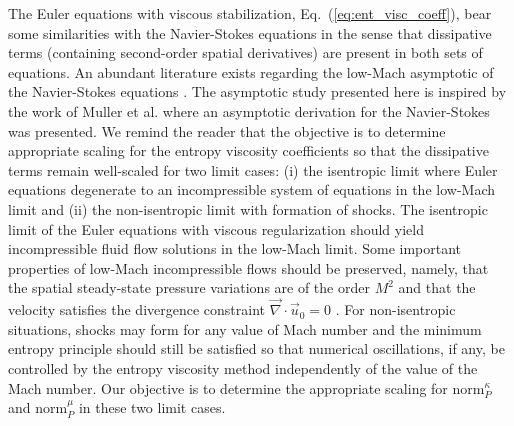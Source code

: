 \documentclass[review,10pt]{elsarticle}
\renewcommand{\div}{\vec{\nabla}\! \cdot \!}
\newcommand{\norm}{\textrm{norm}}
\newcommand{\eqt}[1]{Eq.~(\ref{#1})}                     %
\begin{document}
The Euler equations with viscous stabilization, \eqt{eq:ent_visc_coeff}, bear some similarities with 
the Navier-Stokes equations in the sense that dissipative terms (containing second-order spatial derivatives) 
are present in both sets of equations. An abundant literature exists regarding the low-Mach asymptotic 
of the Navier-Stokes equations \cite{LowMach1, LowMach2, LowMach3, Muller}.   
%
The asymptotic study presented here is inspired by the work of Muller et al. \cite{Muller} where 
an asymptotic derivation for the Navier-Stokes was presented. 
We remind the reader that the objective is to determine appropriate scaling for the entropy 
viscosity coefficients so that the dissipative terms remain well-scaled for two limit cases: 
(i) the isentropic limit where Euler equations degenerate to an incompressible system of 
equations in the low-Mach limit and 
(ii) the non-isentropic limit with formation of shocks. 
The isentropic limit of the Euler equations with viscous regularization should yield incompressible 
fluid flow solutions in the low-Mach limit. Some important properties of low-Mach incompressible flows should be preserved, 
namely, that the spatial steady-state pressure variations are of the 
order $M^2$ and that the velocity satisfies the divergence constraint $\div \vec{u}_0 = 0$ 
\cite{LowMach1, LowMach2, LowMach3}. For non-isentropic situations, shocks may form for any 
value of Mach number and the minimum entropy principle should still be satisfied so that numerical 
oscillations, if any, be controlled by the entropy viscosity method independently of the value of the Mach number.
Our objective is to determine the appropriate scaling for $\norm_P^\kappa$ and $\norm_P^\mu$ in these two limit cases.
\end{document}
